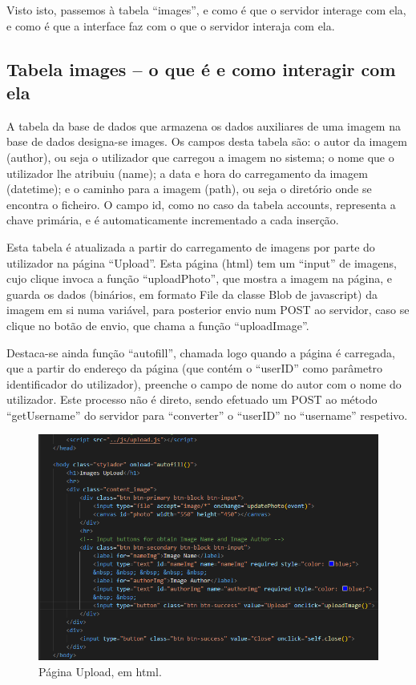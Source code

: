 \documentclass{report}
\begin{document}
 Visto isto, passemos à tabela “images”, e como é que o servidor interage com ela, e como é que a interface faz com o que o servidor interaja com ela.

\newpage


\subsection{Tabela images – o que é e como interagir com ela}

A tabela da base de dados que armazena os dados auxiliares de uma imagem na base de dados designa-se images. Os campos desta tabela são: o autor da imagem (author), ou seja o utilizador que carregou a imagem no sistema; o nome que o utilizador lhe atribuiu (name); a data e hora do carregamento da imagem (datetime); e o caminho para a imagem (path), ou seja o diretório onde se encontra o ficheiro. O campo id, como no caso da tabela accounts, representa a chave primária, e é automaticamente incrementado a cada inserção.

\linebreak
\bigskip

	Esta tabela é atualizada a partir do carregamento de imagens por parte do utilizador na página “Upload”. Esta página (html) tem um “input” de imagens, cujo clique invoca a função “uploadPhoto”, que mostra a imagem na página, e guarda os dados (binários, em formato File da classe Blob de javascript) da imagem em si numa variável, para posterior envio num POST ao servidor, caso se clique no botão de envio, que chama a função “uploadImage”.

\linebreak
\bigskip

	Destaca-se ainda função “autofill”, chamada logo quando a página é carregada, que a partir do endereço da página (que contém o “userID” como parâmetro identificador do utilizador), preenche o campo de nome do autor com o nome do utilizador. Este processo não é direto, sendo efetuado um POST ao método “getUsername” do servidor para “converter” o “userID” no “username” respetivo. 

\newpage

\begin{figure}[!hbtp]

        \includegraphics[scale=0.6]{Images_code/9 - html upload.png}
        \caption{\label{Estrutura}Página Upload, em html.}
\end{figure}
\end{document}
